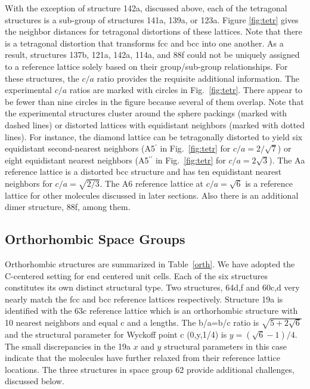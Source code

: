 \documentclass[preprint]{revtex4}              %
\begin{document}
With the exception of structure 142a, discussed above, each of the
tetragonal structures is a sub-group of structures 141a, 139a, or
123a. Figure \ref{fig:tetr} gives the neighbor distances for
tetragonal distortions of these lattices.  Note that there is a
tetragonal distortion that transforms fcc and bcc into one another.
As a result, structures 137b, 121a, 142a, 114a, and 88f could not be
uniquely assigned to a reference lattice solely based on their
group/sub-group relationships.  For these structures, the $c/a$
ratio provides the requisite additional information.  The
experimental $c/a$ ratios are marked with circles in
Fig.~\ref{fig:tetr}. There appear to be fewer than nine circles in
the figure because several of them overlap. Note that the
experimental structures cluster around the sphere packings (marked
with dashed lines) or distorted lattices with equidistant neighbors
(marked with dotted lines). For instance, the diamond lattice can be
tetragonally distorted to yield six equidistant second-nearest
neighbors (A5$^\prime$ in Fig.\ \ref{fig:tetr} for $c/a=2/\sqrt{7}$)
or eight equidistant nearest neighbors (A5$^{\prime\prime}$ in Fig.\
\ref{fig:tetr} for $c/a=2\sqrt{3}$). The Aa reference lattice is a
distorted bcc structure and has ten equidistant nearest neighbors
for $c/a=\sqrt{2/3}$. The A6 reference lattice at $c/a=\sqrt{6}$ is
a reference lattice for other molecules discussed in later sections.
Also there is an additional dimer structure, 88f, among them.

\subsection{Orthorhombic Space Groups}

Orthorhombic structures are summarized in Table~\ref{orth}. We have
adopted the C-centered setting for end centered unit cells. Each of
the six structures constitutes its own distinct structural type. Two
structures, 64d,f and 60c,d very nearly match the fcc and bcc
reference lattices respectively. Structure 19a is identified with
the 63c reference lattice which is an orthorhombic structure with 10
nearest neighbors and equal c and a lengths. The b/a=b/c ratio is
$\sqrt{5+2\sqrt{6}}$ and the structural parameter for Wyckoff point
c (0,y,1/4) is $y=(\sqrt{6}-1)/4$. The small discrepancies in the
19a $x$ and $y$ structural parameters in this case indicate that the
molecules have further relaxed from their reference lattice
locations.  The three structures in space group 62 provide
additional challenges, discussed below.
\end{document}
